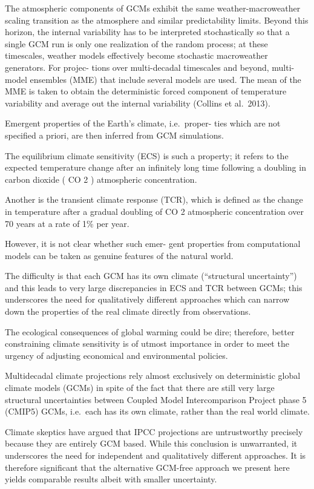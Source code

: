 \documentclass[
]{book}
\begin{document}
The atmospheric components of GCMs exhibit the same
weather-macroweather scaling transition as the atmosphere
and similar predictability limits. Beyond this horizon, the
internal variability has to be interpreted stochastically so
that a single GCM run is only one realization of the random
process; at these timescales, weather models effectively
become stochastic macroweather generators. For projec-
tions over multi-decadal timescales and beyond, multi-model
ensembles (MME) that include several models are used. The
mean of the MME is taken to obtain the deterministic forced
component of temperature variability and average out the
internal variability (Collins et al.~2013).

Emergent properties of the Earth's climate, i.e.~proper-
ties which are not specified a priori, are then inferred from
GCM simulations.

The equilibrium climate sensitivity (ECS)
is such a property; it refers to the expected temperature
change after an infinitely long time following a doubling in
carbon dioxide ( CO 2 ) atmospheric concentration.

Another is the transient climate response (TCR), which is defined
as the change in temperature after a gradual doubling of
CO 2 atmospheric concentration over 70 years at a rate of
1\% per year.

However, it is not clear whether such emer-
gent properties from computational models can be taken as
genuine features of the natural world.

The difficulty is that
each GCM has its own climate (``structural uncertainty'')
and this leads to very large discrepancies in ECS and TCR
between GCMs; this underscores the need for qualitatively
different approaches which can narrow down the properties
of the real climate directly from observations.

The ecological consequences of global warming could be dire;
therefore, better constraining climate sensitivity is of
utmost importance in order to meet the urgency of adjusting
economical and environmental policies.

Multidecadal climate projections rely almost exclusively
on deterministic global climate models (GCMs) in spite of
the fact that there are still very large structural uncertainties
between Coupled Model Intercomparison Project phase 5
(CMIP5) GCMs, i.e.~each has its own climate, rather than
the real world climate.

Climate skeptics have argued that
IPCC projections are untrustworthy precisely because they
are entirely GCM based.
While this conclusion is unwarranted, it underscores the need for
independent and qualitatively different approaches.
It is therefore significant that
the alternative GCM-free approach we present here yields
comparable results albeit with smaller uncertainty.
\end{document}

